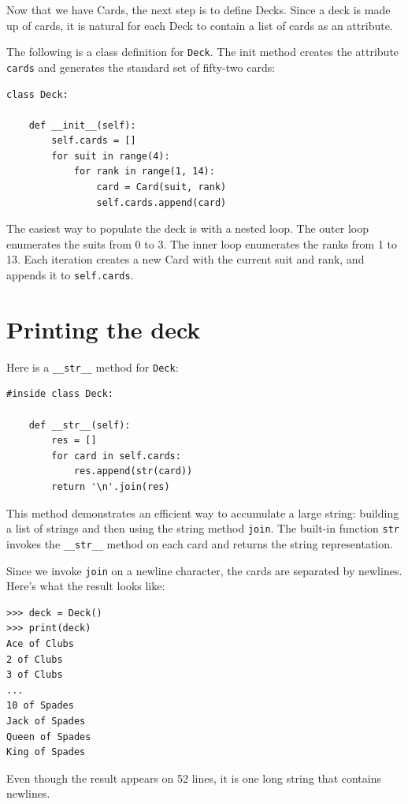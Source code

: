 \documentclass[10pt]{book}
\begin{document}
Now that we have Cards, the next step is to define Decks.  Since a
deck is made up of cards, it is natural for each Deck to contain a
list of cards as an attribute.

The following is a class definition for {\tt Deck}.  The
init method creates the attribute {\tt cards} and generates
the standard set of fifty-two cards:

\begin{verbatim}
class Deck:

    def __init__(self):
        self.cards = []
        for suit in range(4):
            for rank in range(1, 14):
                card = Card(suit, rank)
                self.cards.append(card)
\end{verbatim}
%
The easiest way to populate the deck is with a nested loop.  The outer
loop enumerates the suits from 0 to 3.  The inner loop enumerates the
ranks from 1 to 13.  Each iteration
creates a new Card with the current suit and rank,
and appends it to {\tt self.cards}.


\section{Printing the deck}
\label{printdeck}

Here is a \verb"__str__" method for {\tt Deck}:

\begin{verbatim}
#inside class Deck:

    def __str__(self):
        res = []
        for card in self.cards:
            res.append(str(card))
        return '\n'.join(res)
\end{verbatim}
%
This method demonstrates an efficient way to accumulate a large
string: building a list of strings and then using the string method
{\tt join}.  The built-in function {\tt str} invokes the
\verb"__str__" method on each card and returns the string
representation.   
  

Since we invoke {\tt join} on a newline character, the cards
are separated by newlines.  Here's what the result looks like:

\begin{verbatim}
>>> deck = Deck()
>>> print(deck)
Ace of Clubs
2 of Clubs
3 of Clubs
...
10 of Spades
Jack of Spades
Queen of Spades
King of Spades
\end{verbatim}
%
Even though the result appears on 52 lines, it is
one long string that contains newlines.
\end{document}
